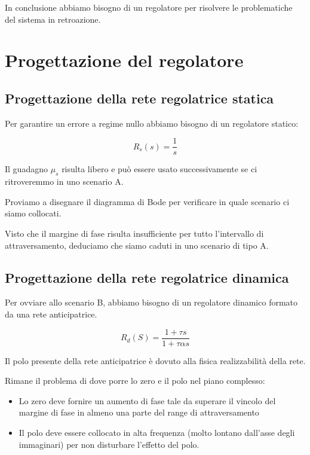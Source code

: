 \documentclass{article}
\begin{document}
In conclusione abbiamo bisogno di un regolatore per risolvere le problematiche del sistema in retroazione.

\section{Progettazione del regolatore}

\subsection{Progettazione della rete regolatrice statica}

Per garantire un errore a regime nullo abbiamo bisogno di un regolatore statico:

$$
R_s(s)=\frac{1}{s}
$$

Il guadagno $\mu_s$ risulta libero e può essere usato successivamente se ci ritroveremmo in uno scenario A.

Proviamo a disegnare il diagramma di Bode per verificare in quale scenario ci siamo collocati.


Visto che il margine di fase risulta insufficiente per tutto l'intervallo di attraversamento, deduciamo che siamo caduti in uno scenario di tipo A.

\subsection{Progettazione della rete regolatrice dinamica}

Per ovviare allo scenario B, abbiamo bisogno di un regolatore dinamico formato da una rete anticipatrice.

$$
R_d(S)=\frac{1+\tau s}{1+\tau \alpha s}
$$

Il polo presente della rete anticipatrice è dovuto alla fisica realizzabilità della rete.

Rimane il problema di dove porre lo zero e il polo nel piano complesso:
\begin{itemize}
    \item Lo zero deve fornire un aumento di fase tale da superare il vincolo del margine di fase in almeno una parte del range di attraversamento
    \item Il polo deve essere collocato in alta frequenza (molto lontano dall'asse degli immaginari) per non disturbare l'effetto del polo.
\end{itemize}
\end{document}
